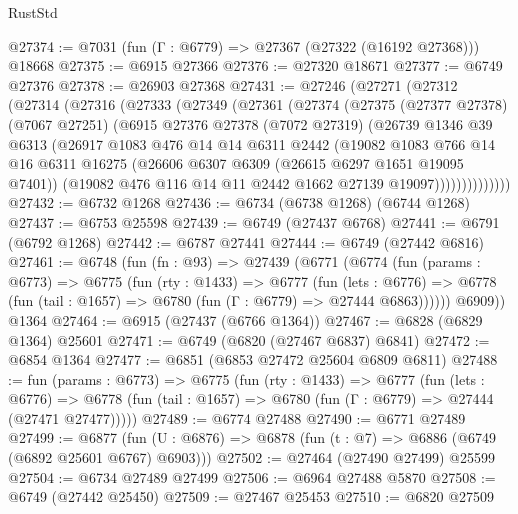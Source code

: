 \begin{lexlean}{RustStd}
\begin{coremodule}
@27374 := @7031 (fun (Γ : @6779) => @27367 (@27322 (@16192 @27368))) @18668
@27375 := @6915 @27366
@27376 := @27320 @18671
@27377 := @6749 @27376
@27378 := @26903 @27368
@27431 := @27246
    (@27271
      (@27312
        (@27314
          (@27316
            (@27333
              (@27349
                (@27361
                  (@27374
                    (@27375
                      (@27377 @27378)
                      (@7067 @27251)
                      (@6915
                        @27376
                        @27378
                        (@7072 @27319)
                        (@26739
                          @1346
                          @39
                          @6313
                          (@26917
                            @1083
                            @476
                            @14
                            @14
                            @6311
                            @2442
                            (@19082
                              @1083
                              @766
                              @14
                              @16
                              @6311
                              @16275
                              (@26606 @6307 @6309 (@26615 @6297 @1651 @19095 @7401))
                              (@19082 @476 @116 @14 @11 @2442 @1662 @27139 @19097))))))))))))))
@27432 := @6732 @1268
@27436 := @6734 (@6738 @1268) (@6744 @1268)
@27437 := @6753 @25598
@27439 := @6749 (@27437 @6768)
@27441 := @6791 (@6792 @1268)
@27442 := @6787 @27441
@27444 := @6749 (@27442 @6816)
@27461 := @6748
    (fun (fn : @93) =>
    @27439
      (@6771
        (@6774
          (fun (params : @6773) =>
          @6775
            (fun (rty : @1433) =>
            @6777
              (fun (lets : @6776) =>
              @6778 (fun (tail : @1657) => @6780 (fun (Γ : @6779) => @27444 @6863))))))
        @6909))
    @1364
@27464 := @6915 (@27437 (@6766 @1364))
@27467 := @6828 (@6829 @1364) @25601
@27471 := @6749 (@6820 (@27467 @6837) @6841)
@27472 := @6854 @1364
@27477 := @6851 (@6853 @27472 @25604 @6809 @6811)
@27488 := fun (params : @6773) =>
  @6775
    (fun (rty : @1433) =>
    @6777
      (fun (lets : @6776) =>
      @6778 (fun (tail : @1657) => @6780 (fun (Γ : @6779) => @27444 (@27471 @27477)))))
@27489 := @6774 @27488
@27490 := @6771 @27489
@27499 := @6877
    (fun (U : @6876) => @6878 (fun (t : @7) => @6886 (@6749 (@6892 @25601 @6767) @6903)))
@27502 := @27464 (@27490 @27499) @25599
@27504 := @6734 @27489 @27499
@27506 := @6964 @27488 @5870
@27508 := @6749 (@27442 @25450)
@27509 := @27467 @25453
@27510 := @6820 @27509

\end{coremodule}
\end{lexlean}
